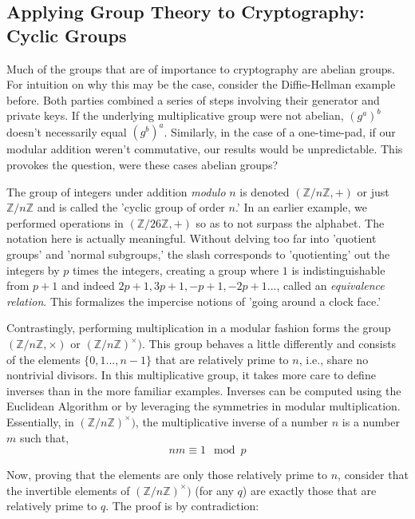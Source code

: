 \documentclass[11pt, a4paper]{report}
\newcommand{\integers}{\mathbb{Z}}
\begin{document}
\subsection{Applying Group Theory to Cryptography: Cyclic Groups}

  Much of the groups that are of importance to cryptography are abelian groups. For intuition on why this may be the case, consider the Diffie-Hellman example before. Both parties combined a series of steps involving their generator and private keys. If the underlying multiplicative group were not abelian, $(g^a)^b$ doesn't necessarily equal $(g^b)^a$. Similarly, in the case of a one-time-pad, if our modular addition weren't commutative, our results would be unpredictable. This provokes the question, were these cases abelian groups?
 
 The group of integers under addition \textit{modulo} $n$ is denoted $(\integers / n \integers, +)$ or just $\integers / n \integers$  and is called the 'cyclic group of order $n$.' In an earlier example, we performed operations in $(\integers / 26 \integers, +)$ so as to not surpass the alphabet. The notation here is actually meaningful. Without delving too far into 'quotient groups' and 'normal subgroups,' the slash corresponds to 'quotienting' out the integers by $p$ times the integers, creating a group where $1$ is indistinguishable from $p+1$ and indeed $2p+1, 3p+1, -p+1, -2p+1...$, called an \textit{equivalence relation}.\autocite[104]{saracino} This formalizes the impercise notions of 'going around a clock face.'
  
  Contrastingly, performing multiplication in a modular fashion forms the group $(\integers / n \integers, \times)$ or $(\integers / n \integers)^{\times})$. This group behaves a little differently and consists of the elements $\lbrace 0, 1 ...,n-1\rbrace$ that are relatively prime to $n$, i.e., share no nontrivial divisors. In this multiplicative group, it takes more care to define inverses than in the more familiar examples. Inverses can be computed using the Euclidean Algorithm or by leveraging the symmetries in modular multiplication. Essentially, in $(\integers / n \integers)^{\times})$, the multiplicative inverse of a number $n$ is a number $m$ such that,
\[ nm \equiv 1 \mod p\]

Now, proving that the elements are only those relatively prime to $n$, consider that the invertible elements of $(\integers / n \integers)^{\times})$ (for any $q$) are exactly those that are relatively prime to $q$. The proof is by contradiction:
\end{document}
